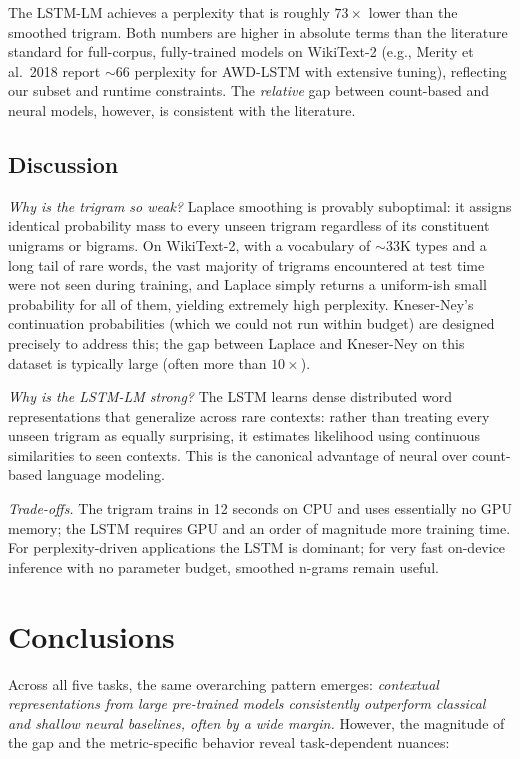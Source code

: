 \documentclass[11pt,a4paper]{article}
\begin{document}
The LSTM-LM achieves a perplexity that is roughly $73\times$ lower than the smoothed trigram. Both numbers are higher in absolute terms than the literature standard for full-corpus, fully-trained models on WikiText-2 (e.g., Merity et al.\ 2018 report $\sim$66 perplexity for AWD-LSTM with extensive tuning), reflecting our subset and runtime constraints. The \emph{relative} gap between count-based and neural models, however, is consistent with the literature.

\subsection{Discussion}

\textit{Why is the trigram so weak?} Laplace smoothing is provably suboptimal: it assigns identical probability mass to every unseen trigram regardless of its constituent unigrams or bigrams. On WikiText-2, with a vocabulary of $\sim$33K types and a long tail of rare words, the vast majority of trigrams encountered at test time were not seen during training, and Laplace simply returns a uniform-ish small probability for all of them, yielding extremely high perplexity. Kneser-Ney's continuation probabilities (which we could not run within budget) are designed precisely to address this; the gap between Laplace and Kneser-Ney on this dataset is typically large (often more than $10\times$).

\textit{Why is the LSTM-LM strong?} The LSTM learns dense distributed word representations that generalize across rare contexts: rather than treating every unseen trigram as equally surprising, it estimates likelihood using continuous similarities to seen contexts. This is the canonical advantage of neural over count-based language modeling.

\textit{Trade-offs.} The trigram trains in 12 seconds on CPU and uses essentially no GPU memory; the LSTM requires GPU and an order of magnitude more training time. For perplexity-driven applications the LSTM is dominant; for very fast on-device inference with no parameter budget, smoothed n-grams remain useful.

\section{Conclusions}

Across all five tasks, the same overarching pattern emerges: \emph{contextual representations from large pre-trained models consistently outperform classical and shallow neural baselines, often by a wide margin.} However, the magnitude of the gap and the metric-specific behavior reveal task-dependent nuances:
\end{document}
